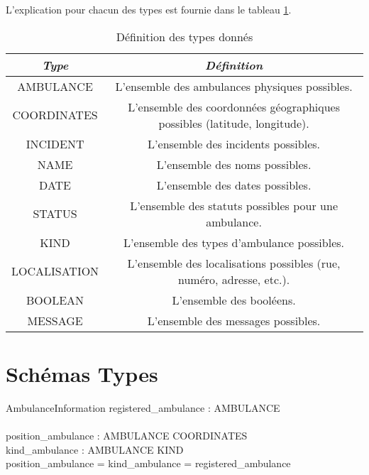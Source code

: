 \documentclass[12pt]{article}
\begin{document}
L'explication pour chacun des types est fournie dans le tableau \ref{tab:typedefinition}.
\begin{table}[htdp]
\begin{center}\begin{tabular}{|c|c|}
	\hline 
	\textit{Type} & \textit{Définition} \\
	\hline
	AMBULANCE & L'ensemble des ambulances physiques possibles. \\
	\hline
	COORDINATES & L'ensemble des coordonnées géographiques possibles (latitude, longitude). \\
	\hline
	INCIDENT & L'ensemble des incidents possibles. \\
	\hline
	NAME & L'ensemble des noms possibles. \\ %
	\hline
	DATE & L'ensemble des dates possibles. \\ %
	\hline
	STATUS & L'ensemble des statuts possibles pour une ambulance. \\
	\hline
	KIND & L'ensemble des types d'ambulance possibles. \\
	\hline
	LOCALISATION & L'ensemble des localisations possibles (rue, numéro, adresse, etc.). \\ %
	\hline
	BOOLEAN & L'ensemble des booléens. \\
	\hline
	MESSAGE & L'ensemble des messages possibles. \\
	\hline
\end{tabular}
\caption{Définition des types donnés}
\end{center}
\label{tab:typedefinition}
\end{table}


\section{Schémas Types}
\begin{schema}{AmbulanceInformation}
 	registered\_ambulance : \power AMBULANCE \\
	\newline \\
 	position\_ambulance : AMBULANCE \pinj COORDINATES \\
 	kind\_ambulance : AMBULANCE \pfun KIND \\
  \where
  	\dom position\_ambulance = \dom kind\_ambulance = registered\_ambulance
\end{schema}
\end{document}

